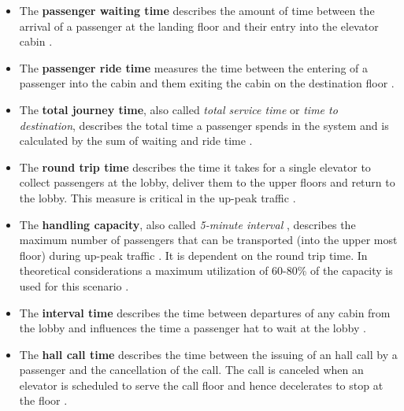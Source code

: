 \begin{itemize}

    \item The \textbf{passenger waiting time} 
        describes the amount of time between the arrival of a passenger at the landing floor 
        and their entry into the elevator cabin 
        \autocite[][p.~7]{hakonen2003simulation}\autocite[][pp.8-9]{siikonen1997models}.
        
    \item The \textbf{passenger ride time} 
        measures the time between the entering of a passenger into the cabin 
        and them exiting the cabin on the destination floor
    \autocite[][pp.8-9]{siikonen1997models}.
    
    \item The \textbf{total journey time}, 
        also called \emph{total service time} \autocite[][p.~10]{beers2015arrivals} or \emph{time to destination},
        describes the total time a passenger spends in the system 
        and is calculated by the sum of waiting and ride time
        \autocite[][pp.8-9]{siikonen1997models}.
        
    \item The \textbf{round trip time} 
        describes the time it takes for a single elevator to collect passengers at the lobby,
        deliver them to the upper floors and return to the lobby. 
        This measure is critical in the up-peak traffic
        \autocite[][pp.8-9]{siikonen1997models}.
        
    \item The \textbf{handling capacity}, 
        also called \emph{5-minute interval}
        \autocite[][p.~194]{unger2015aufzuege},
        describes the maximum number of passengers that can be transported (into the upper most floor) during up-peak traffic
        \autocite[][pp.8-9]{siikonen1997models}.
        It is dependent on the round trip time.
        In theoretical considerations a maximum utilization of 60-80\% of the capacity is used for this scenario
        \autocite[][p.~194]{unger2015aufzuege}\autocite[][p.~7]{hakonen2003simulation}.
    
    \item The \textbf{interval time} 
        describes the time between departures of any cabin from the lobby 
        and influences the time a passenger hat to wait at the lobby
        \autocite[][pp.8-9]{siikonen1997models}.
    
    \item The \textbf{hall call time} 
        describes the time between the issuing of an hall call by a passenger and the cancellation of the call. 
        The call is canceled when an elevator is scheduled to serve the call floor and hence decelerates to stop at the floor
        \autocite[][pp.8-9]{siikonen1997models}. 
    

\end{itemize}

